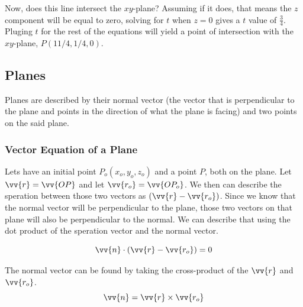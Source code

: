 Now, does this line intersect the $xy$-plane? Assuming if it does, that means the $z$ component will be equal to zero, solving for $t$ when $z=0$ gives a $t$ value of $\frac{3}{4}$. Pluging $t$ for the rest of the equations will yield a point of intersection with the $xy$-plane, $P(11/4, 1/4, 0)$.

\subsection{Planes}
Planes are described by their normal vector (the vector that is perpendicular to the plane and points in the direction of what the plane is facing) and two points on the said plane. 
	
\subsubsection{Vector Equation of a Plane}
Lets have an initial point $P_o(x_o,y_o,z_o)$ and a point $P$, both on the plane. Let $\vv{r} = \vv{OP}$ and let $\vv{r_o}=\vv{OP_o}$. We then can describe the speration between those two vectors as 
$(\vv{r}-\vv{r_o})$. Since we know that the normal vector will be perpendicular to the plane, those two vectors on that plane will also be perpendicular to the normal. We can describe that using the dot product of the speration vector and the normal vector. 

\begin{equation*}
	\vv{n} \cdot  (\vv{r}-\vv{r_o}) = 0
\end{equation*}

The normal vector can be found by taking the cross-product of the $\vv{r}$ and $\vv{r_o}$.
\begin{equation*}
	\vv{n} = \vv{r} \times \vv{r_o}
\end{equation*}

